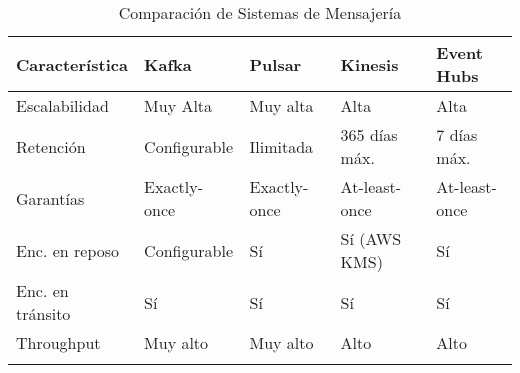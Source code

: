 \begin{longtable}{|p{3cm}|p{2.5cm}|p{3cm}|p{3cm}|p{2.5cm}|}
    \hline
    \textbf{Característica} & \textbf{Kafka} & \textbf{Pulsar} & \textbf{Kinesis} & \textbf{Event Hubs} \\
    \hline
    Escalabilidad & Muy Alta & Muy alta & Alta & Alta \\
    \hline
    Retención & Configurable & Ilimitada & 365 días máx. & 7 días máx. \\
    \hline
    Garantías & Exactly-once & Exactly-once & At-least-once & At-least-once \\
    \hline
    Enc. en reposo & Configurable & Sí & Sí (AWS KMS) & Sí \\
    \hline
    Enc. en tránsito & Sí & Sí & Sí & Sí \\
    \hline
    Throughput & {Muy alto} & {Muy alto} & {Alto} & {Alto} \\
    \hline
    \caption{Comparación de Sistemas de Mensajería}
\end{longtable}
\clearpage
\newpage
